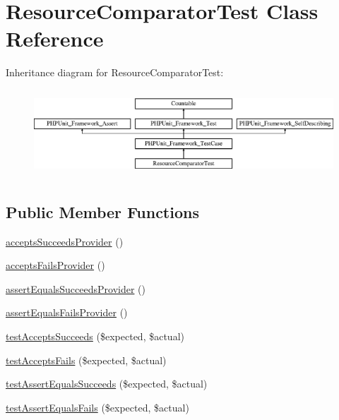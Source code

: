 \hypertarget{class_sebastian_bergmann_1_1_comparator_1_1_resource_comparator_test}{}\section{Resource\+Comparator\+Test Class Reference}
\label{class_sebastian_bergmann_1_1_comparator_1_1_resource_comparator_test}
Inheritance diagram for Resource\+Comparator\+Test\+:\begin{figure}[H]
\begin{center}
\leavevmode
\includegraphics[height=3.303835cm]{class_sebastian_bergmann_1_1_comparator_1_1_resource_comparator_test}
\end{center}
\end{figure}
\subsection*{Public Member Functions}
\begin{DoxyCompactItemize}
\item 
\mbox{\hyperlink{class_sebastian_bergmann_1_1_comparator_1_1_resource_comparator_test_a2ca71e8095ac10e058cd9d7a68da8608}{accepts\+Succeeds\+Provider}} ()
\item 
\mbox{\hyperlink{class_sebastian_bergmann_1_1_comparator_1_1_resource_comparator_test_a9ea19e26cacbca06356c2f229079f8a1}{accepts\+Fails\+Provider}} ()
\item 
\mbox{\hyperlink{class_sebastian_bergmann_1_1_comparator_1_1_resource_comparator_test_acb6bc1b6e9d32990bdd287f8b590a5fa}{assert\+Equals\+Succeeds\+Provider}} ()
\item 
\mbox{\hyperlink{class_sebastian_bergmann_1_1_comparator_1_1_resource_comparator_test_a3cc10e39239b6e3f3fda1d34c0fb1c14}{assert\+Equals\+Fails\+Provider}} ()
\item 
\mbox{\hyperlink{class_sebastian_bergmann_1_1_comparator_1_1_resource_comparator_test_a907ea73398b22f4a8cf37728cfc981e3}{test\+Accepts\+Succeeds}} (\$expected, \$actual)
\item 
\mbox{\hyperlink{class_sebastian_bergmann_1_1_comparator_1_1_resource_comparator_test_afe5eff1a1b7049f973a035117a7e0df1}{test\+Accepts\+Fails}} (\$expected, \$actual)
\item 
\mbox{\hyperlink{class_sebastian_bergmann_1_1_comparator_1_1_resource_comparator_test_afb51e0f06ccb75cc8ad5b284a2e0c4cc}{test\+Assert\+Equals\+Succeeds}} (\$expected, \$actual)
\item 
\mbox{\hyperlink{class_sebastian_bergmann_1_1_comparator_1_1_resource_comparator_test_a8cd8f77da360a8a9822bf4b9c213de5e}{test\+Assert\+Equals\+Fails}} (\$expected, \$actual)
\end{DoxyCompactItemize}
